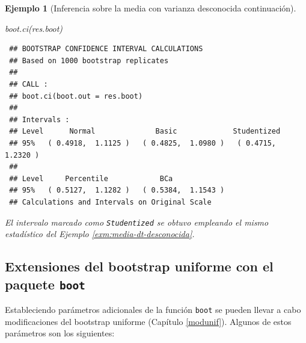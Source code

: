 \documentclass[
]{book}
\newenvironment{Shaded}{\begin{snugshade}}{\end{snugshade}}
\newcommand{\FunctionTok}[1]{\textcolor[rgb]{0.00,0.00,0.00}{#1}}
\newcommand{\NormalTok}[1]{#1}
\theoremstyle{break}
\newtheorem{example}{Ejemplo}[chapter]
\theoremstyle{nonumberplain}
\begin{document}
\begin{example}[Inferencia sobre la media con varianza desconocida continuación]
\begin{Shaded}
\begin{Highlighting}[]
\FunctionTok{boot.ci}\NormalTok{(res.boot)}
\end{Highlighting}
\end{Shaded}

\begin{verbatim}
 ## BOOTSTRAP CONFIDENCE INTERVAL CALCULATIONS
 ## Based on 1000 bootstrap replicates
 ## 
 ## CALL : 
 ## boot.ci(boot.out = res.boot)
 ## 
 ## Intervals : 
 ## Level      Normal              Basic             Studentized     
 ## 95%   ( 0.4918,  1.1125 )   ( 0.4825,  1.0980 )   ( 0.4715,  1.2320 )  
 ## 
 ## Level     Percentile            BCa          
 ## 95%   ( 0.5127,  1.1282 )   ( 0.5384,  1.1543 )  
 ## Calculations and Intervals on Original Scale
\end{verbatim}

El intervalo marcado como \texttt{Studentized} se obtuvo empleando el mismo estadístico del Ejemplo \ref{exm:media-dt-desconocida}.
\end{example}

\hypertarget{extensiones-del-bootstrap-uniforme-con-el-paquete-boot}{%
\subsection{\texorpdfstring{Extensiones del bootstrap uniforme con el paquete \texttt{boot}}{Extensiones del bootstrap uniforme con el paquete boot}}\label{extensiones-del-bootstrap-uniforme-con-el-paquete-boot}}

Estableciendo parámetros adicionales de la función \texttt{boot} se pueden llevar
a cabo modificaciones del bootstrap uniforme (Capítulo \ref{modunif}).
Algunos de estos parámetros son los siguientes:
\end{document}
